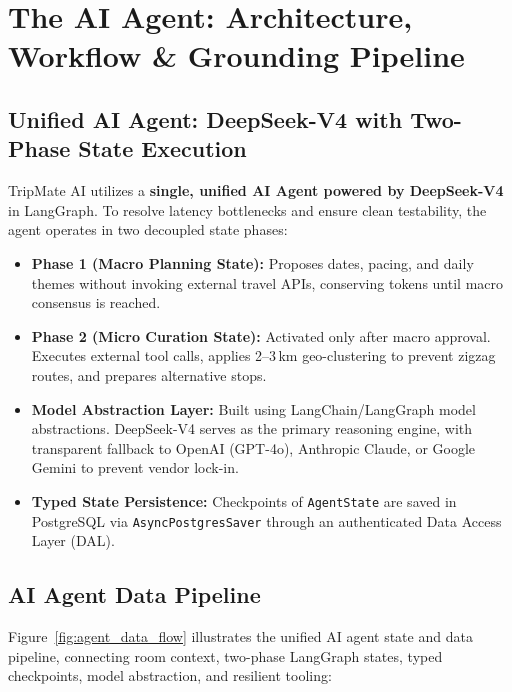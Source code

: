 \documentclass[11pt,a4paper]{article}
\begin{document}
\section{The AI Agent: Architecture, Workflow \& Grounding Pipeline}

\subsection{Unified AI Agent: DeepSeek-V4 with Two-Phase State Execution}
TripMate AI utilizes a \textbf{single, unified AI Agent powered by DeepSeek-V4} in LangGraph. To resolve latency bottlenecks and ensure clean testability, the agent operates in two decoupled state phases:
\begin{itemize}
\item \textbf{Phase 1 (Macro Planning State):} Proposes dates, pacing, and daily themes without invoking external travel APIs, conserving tokens until macro consensus is reached.
\item \textbf{Phase 2 (Micro Curation State):} Activated only after macro approval. Executes external tool calls, applies 2--3\,km geo-clustering to prevent zigzag routes, and prepares alternative stops.
\item \textbf{Model Abstraction Layer:} Built using LangChain/LangGraph model abstractions. DeepSeek-V4 serves as the primary reasoning engine, with transparent fallback to OpenAI (GPT-4o), Anthropic Claude, or Google Gemini to prevent vendor lock-in.
\item \textbf{Typed State Persistence:} Checkpoints of \texttt{AgentState} are saved in PostgreSQL via \texttt{AsyncPostgresSaver} through an authenticated Data Access Layer (DAL).
\end{itemize}

\subsection{AI Agent Data Pipeline}
\label{sec:agent_integration}
Figure~\ref{fig:agent_data_flow} illustrates the unified AI agent state and data pipeline, connecting room context, two-phase LangGraph states, typed checkpoints, model abstraction, and resilient tooling:
\end{document}
